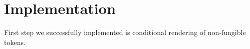 \section{Implementation} \label{sec:impl}

First step we successfully implemented is conditional rendering of non-fungible tokens.

